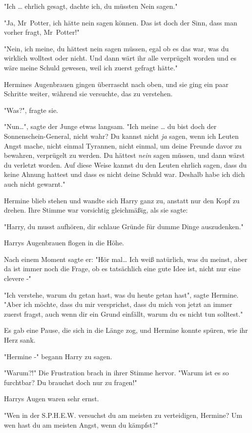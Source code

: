 {"Ich … ehrlich gesagt, dachte ich, du müssten Nein sagen."

"Ja, Mr~Potter, ich hätte nein sagen können. Das ist doch der Sinn, dass man vorher fragt, Mr~Potter!"

"Nein, ich meine, du hättest nein sagen müssen, egal ob es das war, was du wirklich wolltest oder nicht. Und dann wärt ihr alle verprügelt worden und es wäre meine Schuld gewesen, weil ich zuerst gefragt hätte."

Hermines Augenbrauen gingen überrascht nach oben, und sie ging ein paar Schritte weiter, während sie versuchte, das zu verstehen.

"Was?", fragte sie.

"Nun…", sagte der Junge etwas langsam. "Ich meine … du bist doch der Sonnenschein-General, nicht wahr? Du kannst nicht \emph{ja} sagen, wenn ich Leuten Angst mache, nicht einmal Tyrannen, nicht einmal, um deine Freunde davor zu bewahren, verprügelt zu werden. Du hättest \emph{nein} sagen müssen, und dann wärst du verletzt worden. Auf diese Weise kannst du den Leuten ehrlich sagen, dass du keine Ahnung hattest und dass es nicht deine Schuld war. Deshalb habe ich dich auch nicht gewarnt."

Hermine blieb stehen und wandte sich Harry ganz zu, anstatt nur den Kopf zu drehen. Ihre Stimme war vorsichtig gleichmäßig, als sie sagte:

"Harry, du musst aufhören, dir schlaue Gründe für dumme Dinge auszudenken."

Harrys Augenbrauen flogen in die Höhe.

Nach einem Moment sagte er: "Hör mal… Ich weiß natürlich, was du meinst, aber da ist immer noch die Frage, ob es tatsächlich eine gute Idee ist, nicht nur eine clevere -"

"Ich verstehe, warum du getan hast, was du heute getan hast", sagte Hermine. "Aber ich möchte, dass du mir versprichst, dass du mich von jetzt an immer zuerst fragst, auch wenn dir ein Grund einfällt, warum du es nicht tun solltest."

Es gab eine Pause, die sich in die Länge zog, und Hermine konnte spüren, wie ihr Herz sank.

"Hermine -" begann Harry zu sagen.

"Warum?!" Die Frustration brach in ihrer Stimme hervor. "Warum ist es so furchtbar? Du brauchst doch nur zu fragen!"

Harrys Augen waren sehr ernst.

"Wen in der S.P.H.E.W. versuchst du am meisten zu verteidigen, Hermine? Um wen hast du am meisten Angst, wenn du kämpfst?"

}
